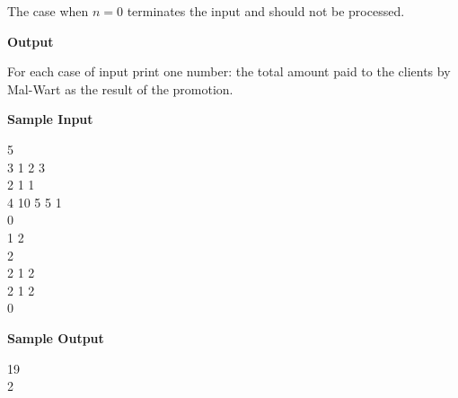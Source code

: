 The case when $n = 0$ terminates the input and should not be processed.

\begin{flushleft}
{\color{red} \textbf{Output}}
\end{flushleft}
For each case of input print one number: the total amount paid to the clients by Mal-Wart as the result of the promotion.

\begin{flushleft}
{\color{red} \textbf{Sample Input}}
\end{flushleft}
\begin{flushleft}
5\\
3 1 2 3\\
2 1 1\\
4 10 5 5 1\\
0\\
1 2\\
2\\
2 1 2\\
2 1 2\\
0\\
\end{flushleft}

\begin{flushleft}
{\color{red} \textbf{Sample Output}}
\end{flushleft}
\begin{flushleft}
19\\
2\\
\end{flushleft}

\newpage